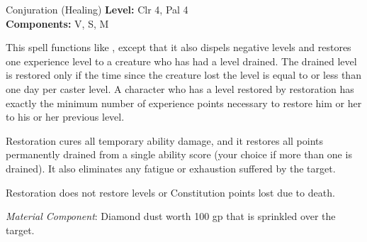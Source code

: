 {Conjuration (Healing)}
{
	\textbf{Level:}
	Clr 4, Pal 4\\
	\textbf{Components:}
	V, S, M\\
}
{
	This spell functions like , except that it also dispels negative levels and restores one experience level to a creature who has had a level drained. The drained level is restored only if the time since the creature lost the level is equal to or less than one day per caster level. A character who has a level restored by restoration has exactly the minimum number of experience points necessary to restore him or her to his or her previous level.

	Restoration cures all temporary ability damage, and it restores all points permanently drained from a single ability score (your choice if more than one is drained). It also eliminates any fatigue or exhaustion suffered by the target.

	Restoration does not restore levels or Constitution points lost due to death.

	\textit{Material Component}:
	Diamond dust worth 100 gp that is sprinkled over the target.

}
